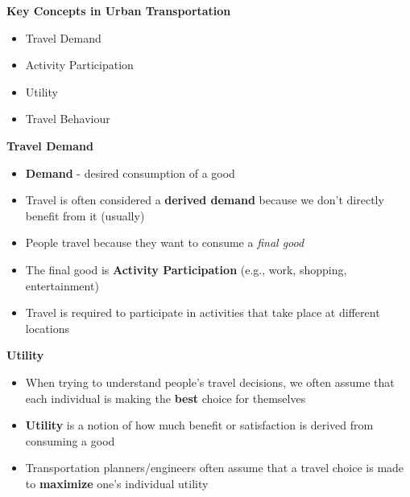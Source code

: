 \documentclass[aspectratio=169]{beamer}
\begin{document}




\begin{frame}
	\LARGE{\textbf{Key Concepts in Urban Transportation}}
	\normalsize
	\vspace{4mm}
	\begin{itemize}
		\item Travel Demand
		\item Activity Participation
		\item Utility
		\item Travel Behaviour
	\end{itemize}
\end{frame}




\begin{frame}
	
	\textbf{Travel Demand}
	\vspace{4mm}
	
	\begin{itemize}
		\item \textbf{Demand} - desired consumption of a good
		
		\item Travel is often considered a \textbf{derived demand} because we don’t directly benefit from it (usually)
		
		\item People travel because they want to consume a \textit{final good}
		
		\item The final good is \textbf{Activity Participation} (e.g., work, shopping, entertainment)
		 
		\item Travel is required to participate in activities that take place at different locations
	\end{itemize}
	
\end{frame}





\begin{frame}
	
	\textbf{Utility}
	\vspace{4mm}
	
	\begin{itemize}
		\item When trying to understand people’s travel decisions, we often assume that each individual is making the \textbf{best} choice for themselves
		
		\item \textbf{Utility} is a notion of how much benefit or satisfaction is derived from consuming a good
		
		\item Transportation planners/engineers often assume that a travel choice is made to \textbf{maximize} one’s individual utility
	\end{itemize}
	
	
\end{frame}
\end{document}
